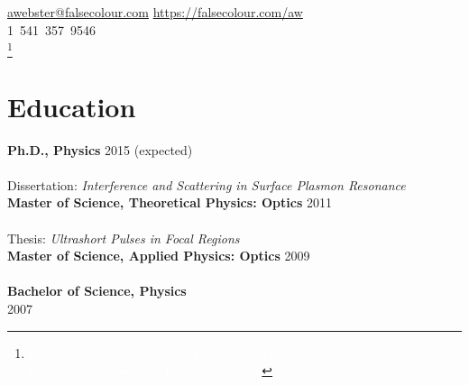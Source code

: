 \documentclass{webster-resume}
\begin{document}

\href{mailto:awebster@falsecolour.com}{awebster@falsecolour.com}
\hfill\href{https://falsecolour.com/aw}{https://falsecolour.com/aw}\\
1~541~357~9546\\
\let\thefootnote\relax\footnote{\textcolor{white}{%
Food for robots: Experience Management Project Development Business Skill Professional Knowledge Team Leadership }}%
 
\section{Education}
\vspace{-0.25em}
{\bf Ph.D., Physics} \hfill 2015 (expected)\\
\hspace*{1em}{Max Planck Institute for the Science of Light, Erlangen, Bavaria, Germany}\\
\hspace*{1em}Dissertation: {\em Interference and Scattering in Surface Plasmon Resonance}
\vspace{0.25em}
\\
{\bf Master of Science, Theoretical Physics: Optics} \hfill 2011\\
\hspace*{1em}{Friedrich-Alexander-Universität Erlangen-Nürnberg, Erlangen, Bavaria, Germany}\\
\hspace*{1em}Thesis: {\em Ultrashort Pulses in Focal Regions}
\vspace{0.25em}
\\
{\bf Master of Science, Applied Physics: Optics} \hfill 2009\\
\hspace*{1em}{University of Oregon, Eugene, Oregon, USA}
\vspace{0.25em}
\\
{\bf Bachelor of Science, Physics}\\
\hspace*{1em}{University of Oregon,  Eugene, Oregon, USA} \hfill 2007
\end{document}
